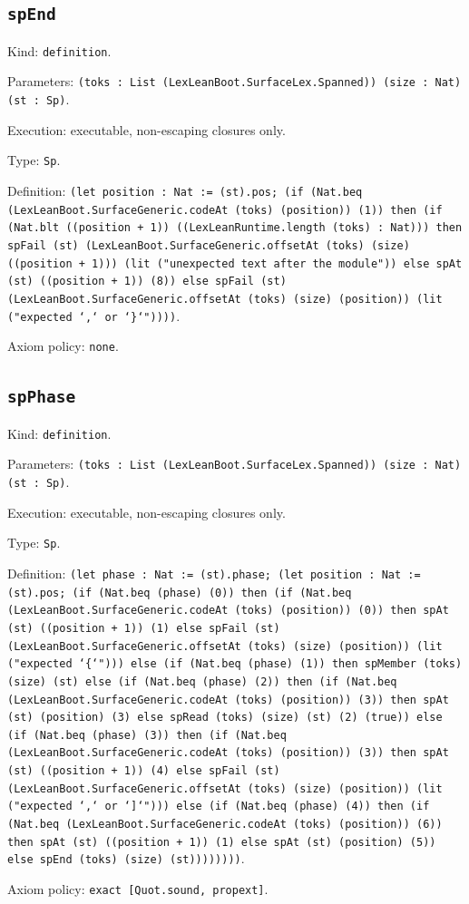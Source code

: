 \documentclass[11pt]{article}
\begin{document}
\subsection*{\texttt{spEnd}}
\noindent Kind: \texttt{definition}.\par
\noindent Parameters: \texttt{(toks : List (LexLeanBoot.SurfaceLex.Spanned)) (size : Nat) (st : Sp)}.\par
\noindent Execution: executable, non-escaping closures only.\par
\noindent Type: \texttt{Sp}.\par
\noindent Definition: \texttt{(let position : Nat := (st).pos; (if (Nat.beq (LexLeanBoot.SurfaceGeneric.codeAt (toks) (position)) (1)) then (if (Nat.blt ((position + 1)) ((LexLeanRuntime.length (toks) : Nat))) then spFail (st) (LexLeanBoot.SurfaceGeneric.offsetAt (toks) (size) ((position + 1))) (lit ("unexpected text after the module")) else spAt (st) ((position + 1)) (8)) else spFail (st) (LexLeanBoot.SurfaceGeneric.offsetAt (toks) (size) (position)) (lit ("expected `,` or `\}`"))))}.\par
\noindent Axiom policy: \texttt{none}.\par
\subsection*{\texttt{spPhase}}
\noindent Kind: \texttt{definition}.\par
\noindent Parameters: \texttt{(toks : List (LexLeanBoot.SurfaceLex.Spanned)) (size : Nat) (st : Sp)}.\par
\noindent Execution: executable, non-escaping closures only.\par
\noindent Type: \texttt{Sp}.\par
\noindent Definition: \texttt{(let phase : Nat := (st).phase; (let position : Nat := (st).pos; (if (Nat.beq (phase) (0)) then (if (Nat.beq (LexLeanBoot.SurfaceGeneric.codeAt (toks) (position)) (0)) then spAt (st) ((position + 1)) (1) else spFail (st) (LexLeanBoot.SurfaceGeneric.offsetAt (toks) (size) (position)) (lit ("expected `\{`"))) else (if (Nat.beq (phase) (1)) then spMember (toks) (size) (st) else (if (Nat.beq (phase) (2)) then (if (Nat.beq (LexLeanBoot.SurfaceGeneric.codeAt (toks) (position)) (3)) then spAt (st) (position) (3) else spRead (toks) (size) (st) (2) (true)) else (if (Nat.beq (phase) (3)) then (if (Nat.beq (LexLeanBoot.SurfaceGeneric.codeAt (toks) (position)) (3)) then spAt (st) ((position + 1)) (4) else spFail (st) (LexLeanBoot.SurfaceGeneric.offsetAt (toks) (size) (position)) (lit ("expected `,` or `]`"))) else (if (Nat.beq (phase) (4)) then (if (Nat.beq (LexLeanBoot.SurfaceGeneric.codeAt (toks) (position)) (6)) then spAt (st) ((position + 1)) (1) else spAt (st) (position) (5)) else spEnd (toks) (size) (st))))))))}.\par
\noindent Axiom policy: \texttt{exact [Quot.sound, propext]}.\par
\end{document}
